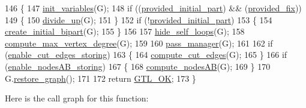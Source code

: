 \begin{DoxyCode}
146 \{
147     \mbox{\hyperlink{classfm__partition_aad791ac648a9ff4694c8960f49dcc018}{init\_variables}}(G);
148     \textcolor{keywordflow}{if} ((\mbox{\hyperlink{classfm__partition_a38c67abb32d7ade03b68f0a7ed9f1c6d}{provided\_initial\_part}}) && (\mbox{\hyperlink{classfm__partition_a0aca0fa4fcaba284d61c745d17022f8d}{provided\_fix}}))
149     \{
150     \mbox{\hyperlink{classfm__partition_ad768579b813500dc2d267aac5668ed48}{divide\_up}}(G);
151     \}
152     \textcolor{keywordflow}{if} (!\mbox{\hyperlink{classfm__partition_a38c67abb32d7ade03b68f0a7ed9f1c6d}{provided\_initial\_part}})
153     \{
154     \mbox{\hyperlink{classfm__partition_a25ef3fc22bee176abfef64248484e8c0}{create\_initial\_bipart}}(G);
155     \}
156     
157     \mbox{\hyperlink{classfm__partition_a3e3aa22119ff5ff9c406683e22ab6078}{hide\_self\_loops}}(G);
158     \mbox{\hyperlink{classfm__partition_a5d0f409b6b1d554a62d67952236c7ce9}{compute\_max\_vertex\_degree}}(G);
159 
160     \mbox{\hyperlink{classfm__partition_aec7b2a315bc003fbd98debd5cd879f99}{pass\_manager}}(G);
161 
162     \textcolor{keywordflow}{if} (\mbox{\hyperlink{classfm__partition_a806c9f5cb781b8ce662d2a3373433777}{enable\_cut\_edges\_storing}})
163     \{
164     \mbox{\hyperlink{classfm__partition_a03c76998f985593caddc4979a28b9042}{compute\_cut\_edges}}(G);
165     \}
166     \textcolor{keywordflow}{if} (\mbox{\hyperlink{classfm__partition_a2e308857dde9405bc3c6b911218bcda1}{enable\_nodesAB\_storing}})
167     \{
168     \mbox{\hyperlink{classfm__partition_aaa8f24af3be860bfa42a171c25420c2c}{compute\_nodesAB}}(G);
169     \}
170     G.\mbox{\hyperlink{classgraph_a53e2a5505fa6427587e12d66e4a86cec}{restore\_graph}}();
171 
172     \textcolor{keywordflow}{return} \mbox{\hyperlink{classalgorithm_af1a0078e153aa99c24f9bdf0d97f6710a5114c20e4a96a76b5de9f28bf15e282b}{GTL\_OK}};
173 \}
\end{DoxyCode}
Here is the call graph for this function\+:\nopagebreak
